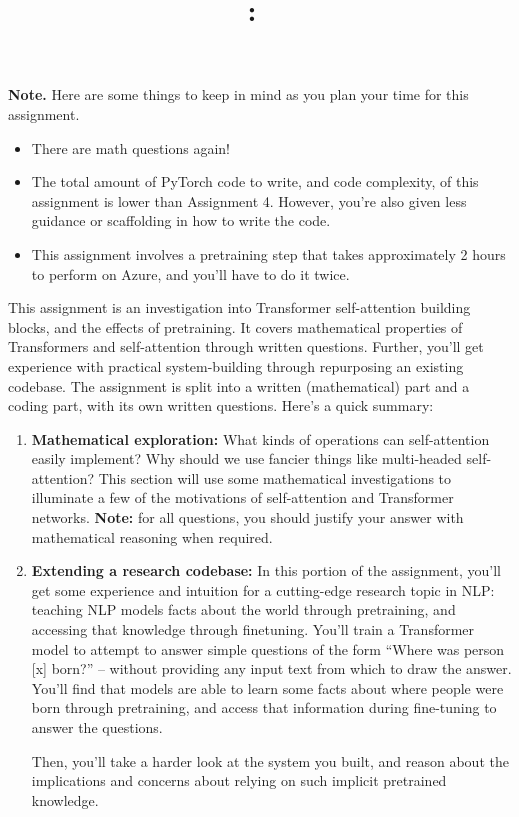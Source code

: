\documentclass[answers]{exam}
\title{
\textmd{\textbf{\hmwkClass:\ \hmwkTitle} \\ \hmwkAuthorName}
}
\author{}
\date{}
\begin{document}
\vspace{-1in}

\maketitle

\vspace{-0.5in}


\begin{framed}
\noindent
 \textbf{Note.} Here are some things to keep in mind as you plan your time for this assignment.
\begin{itemize}
   \item There are math questions again!
   \item The total amount of PyTorch code to write, and code complexity, of this assignment is lower than Assignment 4. 
         However, you're also given less guidance or scaffolding in how to write the code.
         \item  This assignment involves a pretraining step that takes approximately 2 hours to perform on Azure, and you'll have to do it twice.
\end{itemize}
\end{framed}
This assignment is an investigation into Transformer self-attention building blocks, and the effects of pretraining.
It covers mathematical properties of Transformers and self-attention through written questions.
Further, you'll get experience with practical system-building through repurposing an existing codebase.
The assignment is split into a written (mathematical) part and a coding part, with its own written questions.
Here's a quick summary:
\begin{enumerate}
\item \textbf{Mathematical exploration:}  What kinds of operations can self-attention easily implement? Why should we use fancier things like multi-headed self-attention?
This section will use some mathematical investigations to illuminate a few of the motivations of self-attention and Transformer networks.
{\color{red} \textbf{Note:} for all questions, you should justify your answer with mathematical reasoning when required.}
\item \textbf{Extending a research codebase:}
In this portion of the assignment, you'll get some experience and intuition for a cutting-edge research topic in NLP: teaching NLP models facts about the world through pretraining, and accessing that knowledge through finetuning.
You'll train a Transformer model to attempt to answer simple questions of the form ``Where was person [x] born?'' -- without providing any input text from which to draw the answer.
You'll find that models are able to learn some facts about where people were born through pretraining, and access that information during fine-tuning to answer the questions.

Then, you'll take a harder look at the system you built, and reason about the implications and concerns about relying on such implicit pretrained knowledge.

\end{enumerate}
\end{document}
